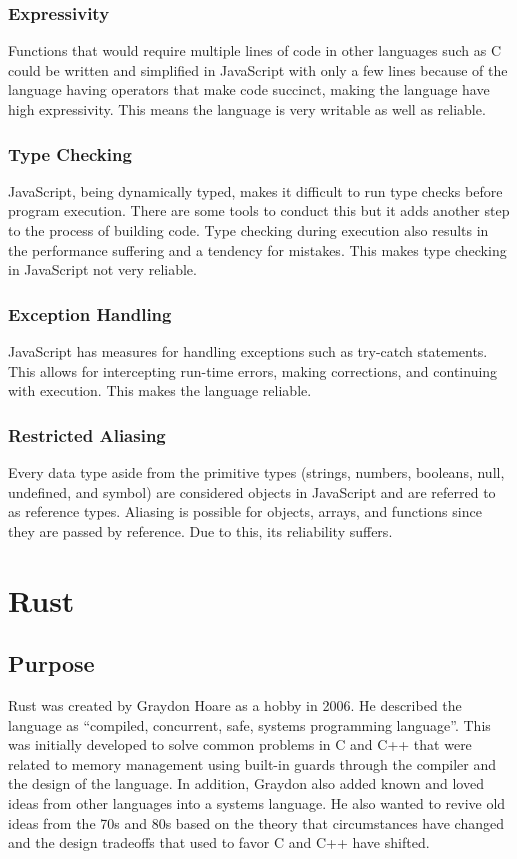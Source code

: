 \documentclass{article}
\begin{document}
  \subsubsection{Expressivity}
  Functions that would require multiple lines of code in other languages such as
  C could be written and simplified in JavaScript with only a few lines because
  of the language having operators that make code succinct, making the language
  have high expressivity. This means the language is very writable as well as
  reliable.

  \subsubsection{Type Checking}
  JavaScript, being dynamically typed, makes it difficult to run type checks
  before program execution. There are some tools to conduct this but it adds
  another step to the process of building code. Type checking during execution
  also results in the performance suffering and a tendency for mistakes. This
  makes type checking in JavaScript not very reliable.

  \subsubsection{Exception Handling}
  JavaScript has measures for handling exceptions such as try-catch statements.
  This allows for intercepting run-time errors, making corrections, and
  continuing with execution. This makes the language reliable.

  \subsubsection{Restricted Aliasing}
  Every data type aside from the primitive types (strings, numbers, booleans,
  null, undefined, and symbol) are considered objects in JavaScript and are
  referred to as reference types. Aliasing is possible for objects, arrays, and
  functions since they are passed by reference. Due to this, its reliability
  suffers.

  \section{Rust}

  \subsection{Purpose}
  Rust was created by Graydon Hoare as a hobby in 2006. He described the
  language as “compiled, concurrent, safe, systems programming language”. This
  was initially developed to solve common problems in C and C++ that were
  related to memory management using built-in guards through the compiler and
  the design of the language. In addition, Graydon also added known and loved
  ideas from other languages into a systems language. He also wanted to revive
  old ideas from the 70s and 80s based on the theory that circumstances have
  changed and the design tradeoffs that used to favor C and C++ have shifted.
\end{document}
